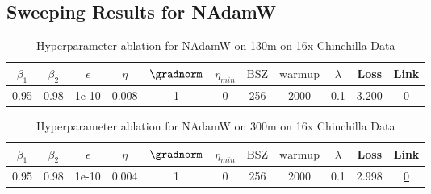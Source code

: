 \subsection{Sweeping Results for NAdamW}%
\begin{table}[H]
\centering
\caption{Hyperparameter ablation for NAdamW on 130m on 16x Chinchilla Data}
\label{tab:ablation_nadamw_130m_on_16x_chinchilla_data}
\begin{tabular}{ccccccccccc}
\toprule
$\beta_1$ & $\beta_2$ & $\epsilon$ & $\eta$ & $\gradnorm$ & $\eta_{min}$ & $\mathrm{BSZ}$ & $\mathrm{warmup}$ & $\lambda$ & Loss & Link \\
\midrule
0.95 & 0.98 & 1e-10 & 0.008 & 1 & 0 & 256 & 2000 & 0.1 & 3.200 & \href{https://wandb.ai/stanford-mercury/optimizer-scaling/runs/sweep-130m-42B-nadamw6383f8lr0.008-wd0.1-minlr0-warmup2000-b10.9-d7e8d3}{0} \\
\midrule
\bottomrule
\end{tabular}
\end{table}

\begin{table}[H]
\centering
\caption{Hyperparameter ablation for NAdamW on 300m on 16x Chinchilla Data}
\label{tab:ablation_nadamw_300m_on_16x_chinchilla_data}
\begin{tabular}{ccccccccccc}
\toprule
$\beta_1$ & $\beta_2$ & $\epsilon$ & $\eta$ & $\gradnorm$ & $\eta_{min}$ & $\mathrm{BSZ}$ & $\mathrm{warmup}$ & $\lambda$ & Loss & Link \\
\midrule
0.95 & 0.98 & 1e-10 & 0.004 & 1 & 0 & 256 & 2000 & 0.1 & 2.998 & \href{https://wandb.ai/stanford-mercury/optimizer-scaling/runs/sweep-300m-96B-nadamw860e52lr0.004-wd0.1-minlr0-warmup2000-b10.9-8d9fe1}{0} \\
\midrule
\bottomrule
\end{tabular}
\end{table}

